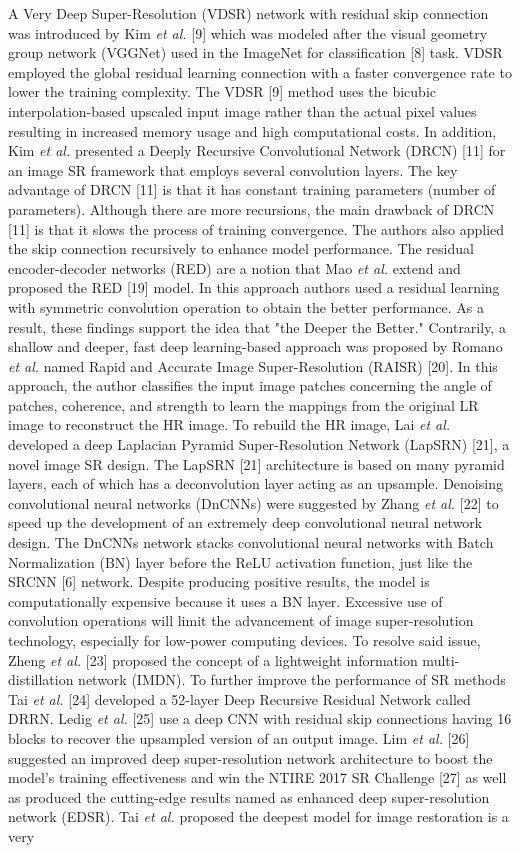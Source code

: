 \documentclass{ieeeaccess}
\begin{document}
A Very Deep Super-Resolution (VDSR) network with residual skip connection was introduced by  Kim \textit{et al.} [9] which was modeled after the visual geometry group network (VGGNet) used in the ImageNet for classification [8] task. VDSR employed the global residual learning connection with a faster convergence rate to lower the training complexity. The VDSR [9] method uses the bicubic interpolation-based upscaled input image rather than the actual pixel values resulting in increased memory usage and high computational costs. In addition, Kim  \textit{et al.} presented a Deeply Recursive Convolutional Network (DRCN) [11] for an image SR framework that employs several convolution layers. The key advantage of DRCN [11] is that it has constant training parameters (number of parameters). Although there are more recursions, the main drawback of DRCN [11] is that it slows the process of training convergence. The authors also applied the skip connection recursively to enhance model performance. The residual encoder-decoder networks (RED) are a notion that Mao \textit{et al.} extend and proposed the RED [19] model. In this approach authors used a residual learning with symmetric convolution operation to obtain the better performance. As a result, these findings support the idea that "the Deeper the Better." Contrarily, a shallow and deeper, fast deep learning-based approach was proposed by Romano \textit{et al.} named Rapid and Accurate Image Super-Resolution (RAISR) [20]. In this approach, the author classifies the input image patches concerning the angle of patches, coherence, and strength to learn the mappings from the original LR image to reconstruct the HR image. To rebuild the HR image, Lai  \textit{et al.} developed a deep Laplacian Pyramid Super-Resolution Network (LapSRN) [21], a novel image SR design. The LapSRN [21] architecture is based on many pyramid layers, each of which has a deconvolution layer acting as an upsample. Denoising convolutional neural networks (DnCNNs) were suggested by Zhang  \textit{et al.} [22] to speed up the development of an extremely deep convolutional neural network design.  The DnCNNs network stacks convolutional neural networks with Batch Normalization (BN) layer before the ReLU activation function, just like the SRCNN [6] network. Despite producing positive results, the model is computationally expensive because it uses a BN layer. Excessive use of convolution operations will limit the advancement of image super-resolution technology, especially for low-power computing devices. To resolve said issue, Zheng  \textit{et al.} [23] proposed the concept of a lightweight information multi-distillation network (IMDN). To further improve the performance of SR methods  Tai \textit{et al.} [24] developed a 52-layer Deep Recursive Residual Network called DRRN. Ledig  \textit{et al.} [25] use a deep CNN with residual skip connections having 16 blocks to recover the upsampled version of an output image. Lim \textit{et al.} [26] suggested an improved deep super-resolution network architecture to boost the model's training effectiveness and win the NTIRE 2017 SR Challenge [27] as well as produced the cutting-edge results named as enhanced deep super-resolution network (EDSR).  Tai \textit{et al.} proposed the deepest model for image restoration is a very 
\end{document}
